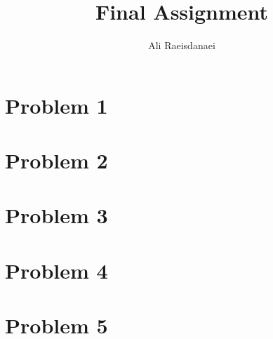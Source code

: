 \documentclass{article}
\begin{document}


\title{Final Assignment}
\author{Ali Raeisdanaei}
\maketitle

\section{Problem 1}


\section{Problem 2}


\section{Problem 3}


\section{Problem 4}


\section{Problem 5}


\printbibliography
\end{document}
